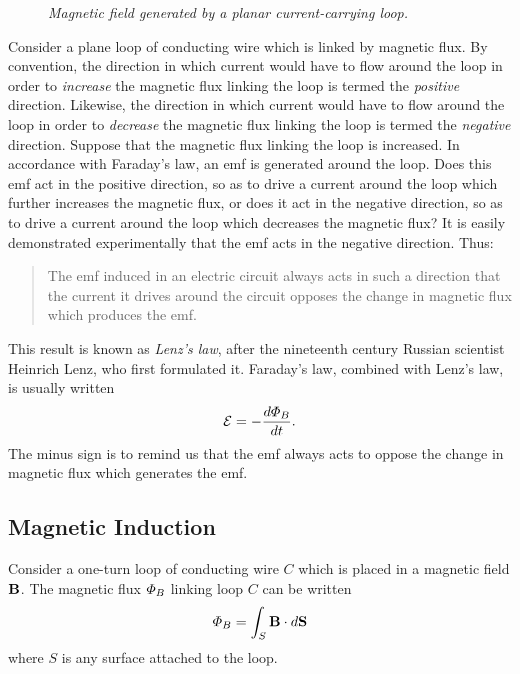 \begin{figure}
\epsfysize=3in
\centerline{}
\caption{\em Magnetic field generated by a planar current-carrying loop.}\label{f9.1}
\end{figure}

Consider a plane loop of conducting wire which is linked by magnetic
flux. By convention, the direction in which current would have to
flow around the loop in order to {\em increase}\/ the magnetic flux linking the loop
is termed the {\em positive}\/ direction. Likewise, the direction  in which current would have to
flow around the loop in order to {\em decrease}\/ the magnetic flux
linking the loop
is termed the {\em negative}\/ direction. Suppose that the magnetic flux linking the
loop is increased.  In accordance with 
Faraday's law, an emf is generated around the loop.
 Does this emf act in the positive
direction, so as to drive a current around the loop
which further increases the magnetic flux, or does it act in the
negative direction, so as to drive a current around the loop which
decreases the magnetic flux? It is easily demonstrated experimentally that the
emf acts in the negative direction. Thus:
\begin{quote}
{\sf The emf induced in an electric circuit always acts in such a direction that
the current it drives around the circuit  opposes the change 
in magnetic flux which produces the emf.}
\end{quote}
This result is known as {\em Lenz's law}, after the nineteenth century Russian
scientist Heinrich Lenz, who first formulated it. Faraday's law, combined with
Lenz's law,  is usually
written
\begin{equation}
{\cal E} = -\frac{d{\mit\Phi}_B}{dt}.
\end{equation}
The minus sign is to remind us that the emf always acts to oppose the change
in magnetic flux which generates the emf. 

\subsection{Magnetic Induction}\label{s9.3}
Consider a one-turn loop of conducting wire $C$ which is placed in a magnetic
field ${\bf B}$. The magnetic flux ${\mit\Phi}_B$ linking  loop $C$ can be written
\begin{equation}
{\mit\Phi}_B = \int_S {\bf B}\cdot d{\bf S}
\end{equation}
where $S$ is any surface attached to the loop.

